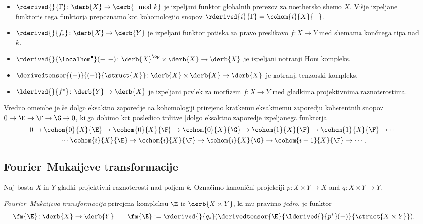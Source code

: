 \begin{itemize}[label = $\rhd$]
    \item $\rderived{}{\Gamma} \colon \derb{X} \to \derb{\mod{k}}$ je izpeljani funktor globalnih prerezov za noethersko shemo $X$. Višje izpeljane funktorje tega funktorja prepoznamo kot kohomologijo snopov $\rderived{i}{\Gamma} = \cohom{i}{X}{-}$.
    \item $\rderived{}{f_*} \colon \derb{X} \to \derb{Y}$ je izpeljani funktor potiska za pravo preslikavo $f \colon X \to Y$ med shemama končnega tipa nad $k$. 
    \item $\rderived{}{\localhom^\bullet}(-, -) \colon \derb{X}^\op \times \derb{X} \to \derb{X}$ je izpeljani notranji Hom kompleks. 
    \item $\derivedtensor{(-)}{(-)}{\struct{X}} \colon \derb{X} \times \derb{X} \to \derb{X}$ je notranji tenzorski kompleks.
    \item $\lderived{}{f^*} \colon \derb{Y} \to \derb{X}$ je izpeljani povlek za morfizem $f \colon X \to Y$ med gladkima projektivnima raznoterostima. 
\end{itemize}

Vredno omembe je še dolgo eksaktno zaporedje na kohomologiji prirejeno kratkemu eksaktnemu zaporedju koherentnih snopov $0 \to \E \to \F \to \G \to 0$, ki ga dobimo kot posledico trditve \ref{dolgo eksaktno zaporedje izpeljanega funktorja}
\begin{multline*}
        0 \to \cohom{0}{X}{\E} \to \cohom{0}{X}{\F} \to \cohom{0}{X}{\G} \to \cohom{1}{X}{\F} \to \cohom{1}{X}{\F} \to \cdots \\
        \cdots \cohom{i}{X}{\E} \to \cohom{i}{X}{\F} \to \cohom{i}{X}{\G} \to \cohom{i+1}{X}{\F} \to \cdots.
    \end{multline*}

\subsection*{Fourier--Mukaijeve transformacije}

Naj bosta $X$ in $Y$ gladki projektivni raznoterosti nad poljem $k$. Označimo kanonični projekciji $p \colon X \times Y \to X$ and $q \colon X \times Y \to Y$. 

\begin{definicija}
    \emph{Fourier--Mukaijeva transformacija} prirejena kompleksu $\E$ iz $\derb{X \times Y}$, ki mu pravimo \emph{jedro}, je funktor
    \[
        \fm{\E} \colon \derb{X} \to \derb{Y} \qquad \fm{\E} := \rderived{}{q_*}(\derivedtensor{\E}{\lderived{}{p^*}(-)}{\struct{X \times Y}}).
    \]
\end{definicija}

